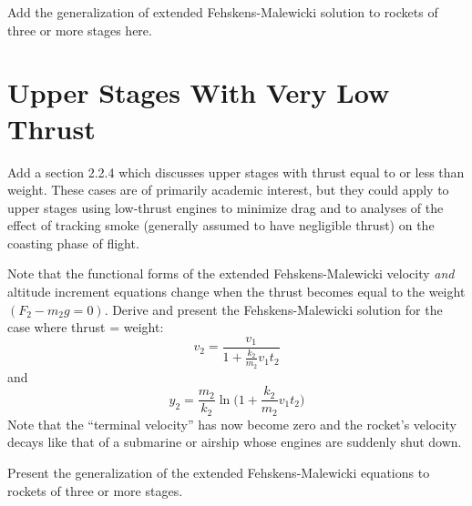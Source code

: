 Add the generalization of extended Fehskens-Malewicki solution to rockets of three or more stages here.

\section*{Upper Stages With Very Low Thrust}\label{supp:ch4-summary:low-thrust}

Add a section 2.2.4 which discusses upper stages with thrust equal to or less than weight. These cases are of
primarily academic interest, but they could apply to upper stages using low-thrust engines to minimize drag
and to analyses of the effect of tracking smoke (generally assumed to have negligible thrust) on the
coasting phase of flight.

Note that the functional forms of the extended Fehskens-Malewicki velocity \emph{and} altitude increment
equations change when the thrust becomes equal to the weight $(F_2 - m_2g = 0)$. Derive and present the
Fehskens-Malewicki solution for the case where thrust = weight:
\begin{equation*}
v_2 = \frac{v_1}{1 + \frac{k_2}{m_2}v_1t_2}
\end{equation*}
and
\begin{equation*}
y_2 = \frac{m_2}{k_2}\ln\biggl(1 + \frac{k_2}{m_2}v_1t_2\biggr)
\end{equation*}
Note that the ``terminal velocity'' has now become zero and the rocket's velocity decays like that of a
submarine or airship whose engines are suddenly shut down.

Present the generalization of the extended Fehskens-Malewicki equations to rockets of three or more stages.

